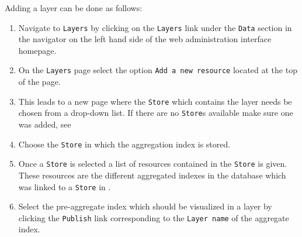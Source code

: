 
Adding a layer can be done as follows: 

\begin{enumerate}
	\item Navigate to \lstinline|Layers| by clicking on the \lstinline|Layers| link under the \lstinline|Data| section in the navigator on the left hand side of the web administration interface homepage.
	\item On the \lstinline|Layers| page select the option \lstinline|Add a new resource| located at the top of the page.
	\item This leads to a new page where the \lstinline|Store| which contains the layer needs be chosen from a drop-down list. If there are no \lstinline|Store|s available make sure one was added, see  
	\item Choose the \lstinline|Store| in which the aggregation index is stored.
	\item Once a \lstinline|Store| is selected a list of resources contained in the \lstinline|Store| is given. These resources are the different aggregated indexes in the database which was linked to a \lstinline|Store| in .
	\item Select the pre-aggregate index which should be visualized in a layer by clicking the \lstinline|Publish| link corresponding to the \lstinline|Layer name| of the aggregate index.
\end{enumerate}


